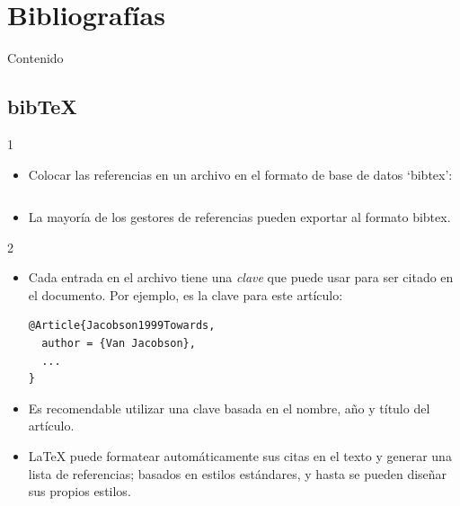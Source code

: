 \documentclass{beamer}
\begin{document}
\section{Bibliografías}

\begin{frame}{Contenido}
  \begin{multicols}{2}
    \tableofcontents[currentsection]
  \end{multicols}
\end{frame}

\subsection{bib\TeX}
\begin{frame}[fragile]{\insertsubsection{} 1}
  \begin{itemize}
  \item Colocar las referencias en un archivo  en el
    formato de base de datos  `bibtex':
    \inputminted[fontsize=\scriptsize,frame=single]{latex}{bib-example.bib}
  \item La mayoría de los gestores de referencias pueden exportar al
    formato bibtex.
  \end{itemize}
\end{frame}

\begin{frame}[fragile]{\insertsubsection{} 2}
  \begin{itemize}
  \item Cada entrada en el archivo   tiene una \emph{clave}
    que puede usar para ser citado en el documento. Por ejemplo,
     es la clave para este artículo:
    \begin{verbatim}
@Article{Jacobson1999Towards,
  author = {Van Jacobson},
  ...
}
    \end{verbatim}
  \item Es recomendable utilizar una clave basada en el nombre, año y
    título del artículo.
  \item \LaTeX{} puede formatear automáticamente sus citas en el texto
    y generar una lista de referencias; basados en estilos estándares,
    y hasta se pueden diseñar sus propios estilos.
  \end{itemize}
\end{frame}
\end{document}
